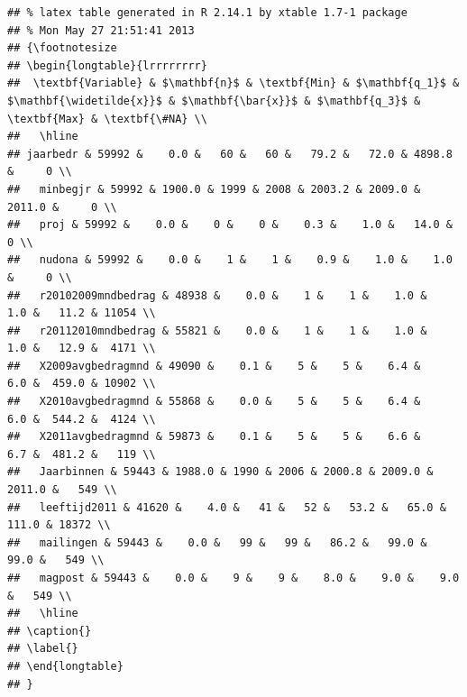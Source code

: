 \documentclass[10pt,a4paper,titlepage]{report}
\begin{document}
\begin{knitrout}
\color{fgcolor}\begin{kframe}


{\ttfamily\noindent\itshape\color{messagecolor}{\#\# Loading required package: xtable}}

{\ttfamily\noindent\itshape\color{messagecolor}{\#\# Loading required package: survival}}

{\ttfamily\noindent\itshape\color{messagecolor}{\#\# Loading required package: splines}}\begin{verbatim}
## % latex table generated in R 2.14.1 by xtable 1.7-1 package
## % Mon May 27 21:51:41 2013
## {\footnotesize
## \begin{longtable}{lrrrrrrrr}
##  \textbf{Variable} & $\mathbf{n}$ & \textbf{Min} & $\mathbf{q_1}$ & $\mathbf{\widetilde{x}}$ & $\mathbf{\bar{x}}$ & $\mathbf{q_3}$ & \textbf{Max} & \textbf{\#NA} \\ 
##   \hline
## jaarbedr & 59992 &    0.0 &   60 &   60 &   79.2 &   72.0 & 4898.8 &     0 \\ 
##   minbegjr & 59992 & 1900.0 & 1999 & 2008 & 2003.2 & 2009.0 & 2011.0 &     0 \\ 
##   proj & 59992 &    0.0 &    0 &    0 &    0.3 &    1.0 &   14.0 &     0 \\ 
##   nudona & 59992 &    0.0 &    1 &    1 &    0.9 &    1.0 &    1.0 &     0 \\ 
##   r20102009mndbedrag & 48938 &    0.0 &    1 &    1 &    1.0 &    1.0 &   11.2 & 11054 \\ 
##   r20112010mndbedrag & 55821 &    0.0 &    1 &    1 &    1.0 &    1.0 &   12.9 &  4171 \\ 
##   X2009avgbedragmnd & 49090 &    0.1 &    5 &    5 &    6.4 &    6.0 &  459.0 & 10902 \\ 
##   X2010avgbedragmnd & 55868 &    0.0 &    5 &    5 &    6.4 &    6.0 &  544.2 &  4124 \\ 
##   X2011avgbedragmnd & 59873 &    0.1 &    5 &    5 &    6.6 &    6.7 &  481.2 &   119 \\ 
##   Jaarbinnen & 59443 & 1988.0 & 1990 & 2006 & 2000.8 & 2009.0 & 2011.0 &   549 \\ 
##   leeftijd2011 & 41620 &    4.0 &   41 &   52 &   53.2 &   65.0 &  111.0 & 18372 \\ 
##   mailingen & 59443 &    0.0 &   99 &   99 &   86.2 &   99.0 &   99.0 &   549 \\ 
##   magpost & 59443 &    0.0 &    9 &    9 &    8.0 &    9.0 &    9.0 &   549 \\ 
##   \hline
## \caption{} 
## \label{}
## \end{longtable}
## }
\end{verbatim}
\end{kframe}
\end{knitrout}
\end{document}
